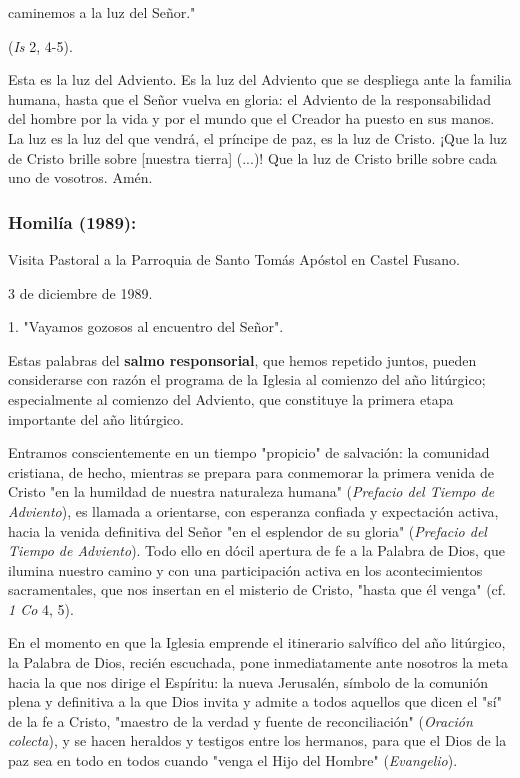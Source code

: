 caminemos a la luz del Señor."

(\emph{Is} 2, 4-5).

Esta es la luz del Adviento. Es la luz del Adviento que se despliega
ante la familia humana, hasta que el Señor vuelva en gloria: el Adviento
de la responsabilidad del hombre por la vida y por el mundo que el
Creador ha puesto en sus manos. La luz es la luz del que vendrá, el
príncipe de paz, es la luz de Cristo. ¡Que la luz de Cristo brille sobre
{[}nuestra tierra{]} (...)! Que la luz de Cristo brille sobre cada uno
de vosotros. Amén.


\subsubsection{Homilía (1989): }
Visita Pastoral a la Parroquia de Santo Tomás Apóstol en Castel Fusano.

3 de diciembre de 1989.

1. "Vayamos gozosos al encuentro del Señor".

Estas palabras del \textbf{salmo responsorial}, que hemos repetido
juntos, pueden considerarse con razón el programa de la Iglesia al
comienzo del año litúrgico; especialmente al comienzo del Adviento, que
constituye la primera etapa importante del año litúrgico.

Entramos conscientemente en un tiempo "propicio" de salvación: la
comunidad cristiana, de hecho, mientras se prepara para conmemorar la
primera venida de Cristo "en la humildad de nuestra naturaleza humana"
(\emph{Prefacio del Tiempo de Adviento}), es llamada a orientarse, con
esperanza confiada y expectación activa, hacia la venida definitiva del
Señor "en el esplendor de su gloria" (\emph{Prefacio del Tiempo de
	Adviento}). Todo ello en dócil apertura de fe a la Palabra de Dios, que
ilumina nuestro camino y con una participación activa en los
acontecimientos sacramentales, que nos insertan en el misterio de
Cristo, "hasta que él venga" (cf. \emph{1 Co} 4, 5).

En el momento en que la Iglesia emprende el itinerario salvífico del año
litúrgico, la Palabra de Dios, recién escuchada, pone inmediatamente
ante nosotros la meta hacia la que nos dirige el Espíritu: la nueva
Jerusalén, símbolo de la comunión plena y definitiva a la que Dios
invita y admite a todos aquellos que dicen el "sí" de la fe a Cristo,
"maestro de la verdad y fuente de reconciliación" (\emph{Oración
	colecta}), y se hacen heraldos y testigos entre los hermanos, para que
el Dios de la paz sea en todo en todos cuando "venga el Hijo del Hombre"
(\emph{Evangelio}).

